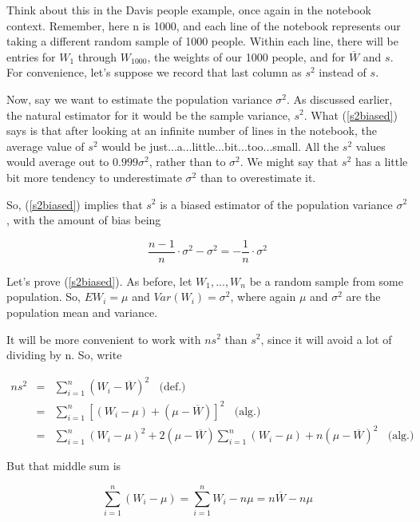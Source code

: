 Think about this in the Davis people example, once again in the notebook
context.  Remember, here n is 1000, and each line of the notebook
represents our taking a different random sample of 1000 people.  Within
each line, there will be entries for  $W_1$ through $W_{1000}$, the
weights of our 1000 people, and for $\overline{W}$ and $s$.  For convenience,
let's suppose we record that last column as $s^2$ instead of $s$.

Now, say we want to estimate the population variance $\sigma^2$.  As
discussed earlier, the natural estimator for it would be the sample
variance, $s^2$.  What (\ref{s2biased}) says is that after looking at an
infinite number of lines in the notebook, the average value of $s^2$
would be just...a...little...bit...too...small.  All the $s^2$ values
would average out to $0.999 \sigma^2$, rather than to $\sigma^2$.  We
might say that $s^2$ has a little bit more tendency to underestimate 
$\sigma^2$ than to overestimate it.

So, (\ref{s2biased}) implies that $s^2$ is a biased estimator of the
population variance $\sigma^2$, with the amount of bias being

\begin{equation}
\frac{n-1}{n} \cdot \sigma^2 - \sigma^2 = -\frac{1}{n} \cdot \sigma^2
\end{equation}

Let's prove (\ref{s2biased}).  As before, let $W_1,...,W_n$ be a random
sample from some population.  So, $EW_i = \mu$ and $Var(W_i) =
\sigma^2$, where again $\mu$ and $\sigma^2$ are the population mean and
variance.

It will be more convenient to work with $ns^2$ than $s^2$, since it will
avoid a lot of dividing by n.  So, write

\begin{eqnarray}
ns^2 &=& \sum_{i=1}^n (W_i - \overline{W})^2 ~~~~ \textrm{(def.)} \\
&=& \sum_{i=1}^n 
\left [
(W_i - \mu) + (\mu - \overline{W})
\right ]^2 ~~~~ \textrm{(alg.)} \\
&=& 
\sum_{i=1}^n (W_i - \mu)^2 +
2 (\mu - \overline{W}) \sum_{i=1}^n (W_i - \mu) +
n (\mu - \overline{W})^2 ~~~~ \textrm{(alg.)}
\end{eqnarray}

But that middle sum is 

\begin{equation}
\sum_{i=1}^n (W_i - \mu) =
\sum_{i=1}^n W_i - n \mu =
n \overline{W} - n \mu
\end{equation}


